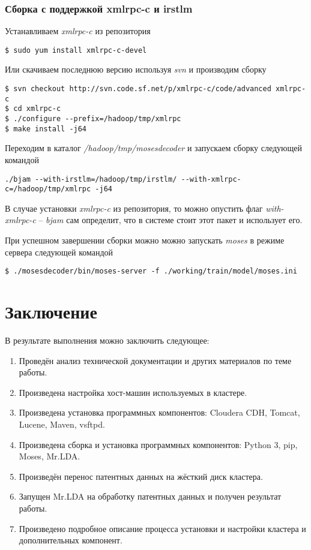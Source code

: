 \subsection{Сборка с поддержкой xmlrpc-c и irstlm}
Устанавливаем \emph{xmlrpc-c} из репозитория
\begin{lstlisting}
$ sudo yum install xmlrpc-c-devel
\end{lstlisting}

Или скачиваем последнюю версию используя \emph{svn} и производим сборку
\begin{lstlisting}
$ svn checkout http://svn.code.sf.net/p/xmlrpc-c/code/advanced xmlrpc-c
$ cd xmlrpc-c
$ ./configure --prefix=/hadoop/tmp/xmlrpc
$ make install -j64
\end{lstlisting}

Переходим в каталог \emph{/hadoop/tmp/mosesdecoder} и запускаем сборку следующей командой
\begin{lstlisting}
./bjam --with-irstlm=/hadoop/tmp/irstlm/ --with-xmlrpc-c=/hadoop/tmp/xmlrpc -j64
\end{lstlisting}
В случае установки \emph{xmlrpc-c} из репозитория, то можно опустить флаг \emph{with-xmlrpc-c} -- 
\emph{bjam} сам определит, что в системе стоит этот пакет и использует его.

При успешном завершении сборки можно можно запускать \emph{moses} в режиме сервера следующей командой
\begin{lstlisting}
$ ./mosesdecoder/bin/moses-server -f ./working/train/model/moses.ini
\end{lstlisting}

\newpage

\chapter{Заключение}
В результате выполнения можно заключить следующее:
\begin{enumerate}
    \item Проведён анализ технической документации и других материалов по теме работы.
    \item Произведена настройка хост-машин используемых в кластере.
    \item Произведена установка программных компонентов: Cloudera CDH, Tomcat, 
    Lucene, Maven, vsftpd.
    \item Произведена сборка и установка программных компонентов: Python 3, pip, Moses, Mr.LDA.
    \item Произведён перенос патентных данных на жёсткий диск кластера.
    \item Запущен Mr.LDA на обработку патентных данных и получен результат работы.
    \item Произведено подробное описание процесса установки и настройки кластера и 
        дополнительных компонент.
\end{enumerate}

